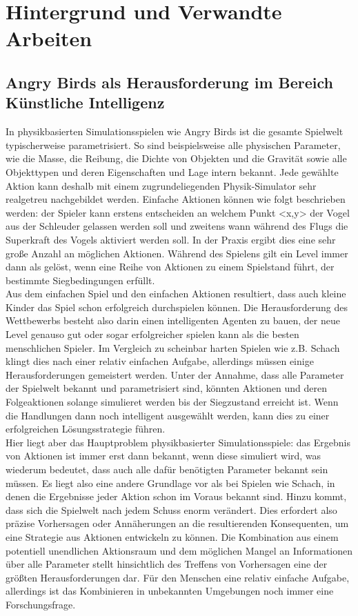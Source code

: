 \section{Hintergrund und Verwandte Arbeiten}

\subsection{Angry Birds als Herausforderung im Bereich Künstliche Intelligenz}
In physikbasierten Simulationsspielen wie Angry Birds ist die gesamte Spielwelt typischerweise parametrisiert. So sind beispielsweise alle physischen Parameter, wie die Masse, die Reibung, die Dichte von Objekten und die Gravität sowie alle Objekttypen und deren Eigenschaften und Lage intern bekannt. Jede gewählte Aktion kann deshalb mit einem zugrundeliegenden Physik-Simulator sehr realgetreu nachgebildet werden. Einfache Aktionen können wie folgt beschrieben werden: der Spieler kann erstens entscheiden an welchem Punkt <x,y> der Vogel aus der Schleuder gelassen werden soll und zweitens wann während des Flugs die Superkraft des Vogels aktiviert werden soll. In der Praxis ergibt dies eine sehr große Anzahl an möglichen Aktionen. Während des Spielens gilt ein Level immer dann als gelöst, wenn eine Reihe von Aktionen zu einem Spielstand führt, der bestimmte Siegbedingungen erfüllt.\\
Aus dem einfachen Spiel und den einfachen Aktionen resultiert, dass auch kleine Kinder das Spiel schon erfolgreich durchspielen können. Die Herausforderung des Wettbewerbs besteht also darin einen intelligenten Agenten zu bauen, der neue Level genauso gut oder sogar erfolgreicher spielen kann als die besten menschlichen Spieler. Im Vergleich zu scheinbar harten Spielen wie z.B. Schach klingt dies nach einer relativ einfachen Aufgabe, allerdings müssen einige Herausforderungen gemeistert werden. Unter der Annahme, dass alle Parameter der Spielwelt bekannt und parametrisiert sind, könnten Aktionen und deren Folgeaktionen solange simulieret werden bis der Siegzustand erreicht ist. Wenn die Handlungen dann noch intelligent ausgewählt werden, kann dies zu einer erfolgreichen Lösungsstrategie führen.\\
Hier liegt aber das Hauptproblem physikbasierter Simulationsspiele: das Ergebnis von Aktionen ist immer erst dann bekannt, wenn diese simuliert wird, was wiederum bedeutet, dass auch alle dafür benötigten Parameter bekannt sein müssen. Es liegt also eine andere Grundlage vor als bei Spielen wie Schach, in denen die Ergebnisse jeder Aktion schon im Voraus bekannt sind. Hinzu kommt, dass sich die Spielwelt nach jedem Schuss enorm verändert. Dies erfordert also präzise Vorhersagen oder Annäherungen an die resultierenden Konsequenten, um eine Strategie aus Aktionen entwickeln zu können. Die Kombination aus einem potentiell unendlichen Aktionsraum und dem möglichen Mangel an Informationen über alle Parameter stellt hinsichtlich des Treffens von Vorhersagen eine der größten Herausforderungen dar. Für den Menschen eine relativ einfache Aufgabe, allerdings ist das Kombinieren in unbekannten Umgebungen noch immer eine Forschungsfrage.\\

